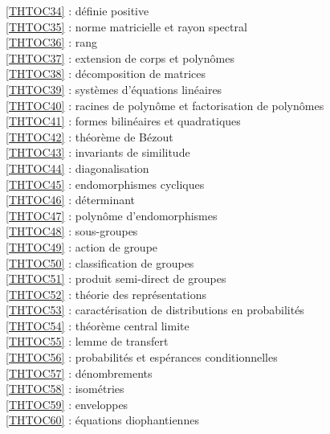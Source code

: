 \ref {THTOC34} : définie positive\\
\ref {THTOC35} : norme matricielle et rayon spectral\\
\ref {THTOC36} : rang\\
\ref {THTOC37} : extension de corps et polynômes\\
\ref {THTOC38} : décomposition de matrices\\
\ref {THTOC39} : systèmes d'équations linéaires\\
\ref {THTOC40} : racines de polynôme et factorisation de polynômes\\
\ref {THTOC41} : formes bilinéaires et quadratiques\\
\ref {THTOC42} : théorème de Bézout\\
\ref {THTOC43} : invariants de similitude\\
\ref {THTOC44} : diagonalisation\\
\ref {THTOC45} : endomorphismes cycliques\\
\ref {THTOC46} : déterminant\\
\ref {THTOC47} : polynôme d'endomorphismes\\
\ref {THTOC48} : sous-groupes\\
\ref {THTOC49} : action de groupe\\
\ref {THTOC50} : classification de groupes\\
\ref {THTOC51} : produit semi-direct de groupes\\
\ref {THTOC52} : théorie des représentations\\
\ref {THTOC53} : caractérisation de distributions en probabilités\\
\ref {THTOC54} : théorème central limite\\
\ref {THTOC55} : lemme de transfert\\
\ref {THTOC56} : probabilités et espérances conditionnelles\\
\ref {THTOC57} : dénombrements\\
\ref {THTOC58} : isométries\\
\ref {THTOC59} : enveloppes\\
\ref {THTOC60} : équations diophantiennes\\
